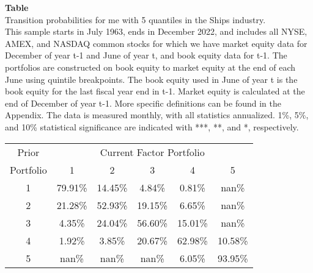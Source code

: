 \begin{table*}[ht!]
\raggedright
{}
\label{tab: transition_probs_me_Ships_with_5_quantiles}
\textbf{Table \thetable} \\
Transition probabilities for me with 5 quantiles in the Ships industry. \\
\hspace*{1em}This sample starts in July 1963, ends in December 2022, and includes all NYSE, AMEX, and NASDAQ common stocks for which we have market equity data for December of year t-1 and June of year t, and book equity data for t-1. The portfolios are constructed on book equity to market equity at the end of each June using quintile breakpoints.  The book equity used in June of year t is the book equity for the last fiscal year end in t-1.  Market equity is calculated at the end of December of year t-1.  More specific definitions can be found in the Appendix.  The data is measured monthly, with all statistics annualized.  1\%, 5\%, and 10\% statistical significance are indicated with ***, **, and *, respectively. \\
\vspace{0.5em}
\centering
\begin{adjustbox}{max width=\textwidth}
\begin{tabular}{@{}cccccc@{}}
\toprule
Prior & \multicolumn{5}{c}{Current Factor Portfolio} \\
Portfolio & 1 & 2 & 3 & 4 & 5 \\
\midrule
1 & 79.91\% & 14.45\% & 4.84\% & 0.81\% & nan\% \\
2 & 21.28\% & 52.93\% & 19.15\% & 6.65\% & nan\% \\
3 & 4.35\% & 24.04\% & 56.60\% & 15.01\% & nan\% \\
4 & 1.92\% & 3.85\% & 20.67\% & 62.98\% & 10.58\% \\
5 & nan\% & nan\% & nan\% & 6.05\% & 93.95\% \\
\bottomrule
\end{tabular}
\end{adjustbox}
\end{table*}